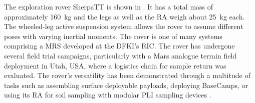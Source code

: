 The exploration rover SherpaTT is shown in . It has a total mass of approximately \SI{160}{\kilo\gram} and the legs as well as the \ac{RA} weigh about \SI{25}{\kilo\gram} each. The wheeled-leg active suspension system allows the rover to assume different poses with varying inertial moments. The rover is one of many systems comprising a \ac{MRS} developed at the \ac{DFKI}'s \ac{RIC}. The rover has undergone several field trial campaigns, particularly with a Mars analogue terrain field deployment  in Utah, USA, where a logistics chain for sample return was evaluated. The rover's versatility has been demonstrated through a multitude of tasks such as assembling surface deployable payloads, deploying BaseCamps, or using its \ac{RA} for soil sampling with modular \ac{PLI} sampling devices .

\vspace{0.4cm}

